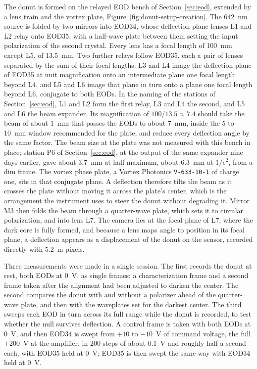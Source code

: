 \documentclass{article}
\begin{document}
The donut is formed on the relayed EOD bench of Section~\ref{sec:eod}, extended by a lens
train and the vortex plate, Figure~\ref{fig:donut-setup-creation}. The 642~nm source is folded by
two mirrors into EOD34, whose deflection plane lenses L1 and L2 relay onto EOD35, with a half-wave
plate between them setting the input polarization of the second crystal. Every lens has a focal
length of 100~mm except L5, of 13.5~mm. Two further relays follow EOD35, each a pair of lenses
separated by the sum of their focal lengths: L3 and L4 image the deflection plane of EOD35 at unit
magnification onto an intermediate plane one focal length beyond L4, and L5 and L6 image that plane
in turn onto a plane one focal length beyond L6, conjugate to both EODs. In the naming of the
stations of Section~\ref{sec:eod}, L1 and L2 form the first relay, L3 and L4 the second, and L5 and
L6 the beam expander. Its magnification of $100/13.5\approx7.4$ should take the beam of about
1~mm that passes the EODs to about 7~mm, inside the 5 to 10~mm window recommended for the
plate, and reduce every deflection angle by the same factor. The beam size at the plate was not
measured with this bench in place; station P6 of Section~\ref{sec:eod}, at the output of the same
expander nine days earlier, gave about 3.7~mm at half maximum, about 6.3~mm at $1/e^2$, from a dim
frame. The vortex phase plate, a Vortex Photonics \texttt{V-633-10-1} of charge one, sits in
that conjugate plane. A deflection therefore tilts the beam as it crosses the plate without moving
it across the plate's center, which is the arrangement the instrument uses to steer the donut
without degrading it. Mirror M3 then folds the beam through a quarter-wave plate, which sets it to
circular polarization, and into lens L7. The camera lies at the focal plane of L7, where the dark
core is fully formed,
and because a lens maps angle to position in its focal plane, a deflection appears as a
displacement of the donut on the sensor, recorded directly with 5.2~\textmu m pixels.

Three measurements were made in a single session. The first records the donut at rest, both
EODs at 0~V, as single frames: a characterization frame and a second frame taken after the
alignment had been adjusted to darken the center. The second compares the donut with and without a
polarizer ahead of the quarter-wave plate, and then with the waveplates set for the darkest center.
The third sweeps each EOD in turn across its full range while the donut is recorded, to test
whether the null survives deflection. A control frame is taken with both EODs at 0~V, and then
EOD34 is swept from $+10$ to $-10$~V of command voltage, the full $\pm200$~V at the amplifier, in
200 steps of about 0.1~V and roughly half a second each, with EOD35 held at 0~V; EOD35 is then
swept the same way with EOD34 held at 0~V.
\end{document}
